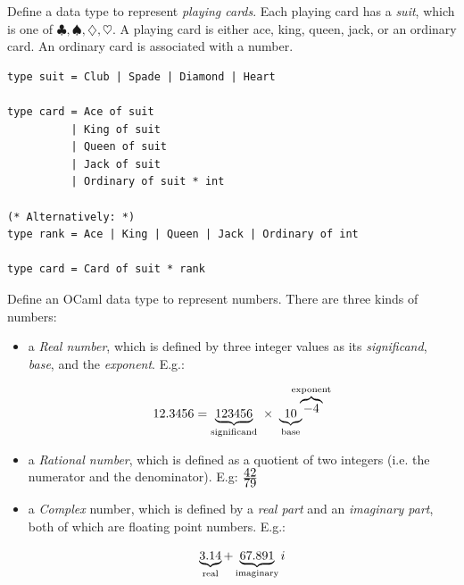 \documentclass[addpoints]{exam}
\begin{document}
\begin{questions}
  
  
  \question
  Define a data type to represent \emph{playing cards}.
  Each playing card has a \emph{suit}, which is one of
  $\clubsuit, \spadesuit, \diamondsuit, \heartsuit$.
  A playing card is either ace, king, queen, jack, or an ordinary card.
  An ordinary card is associated with a number.

  \begin{solutionbox}{6.5cm}
    \begin{verbatim}
type suit = Club | Spade | Diamond | Heart

type card = Ace of suit
          | King of suit
          | Queen of suit
          | Jack of suit
          | Ordinary of suit * int

(* Alternatively: *)
type rank = Ace | King | Queen | Jack | Ordinary of int

type card = Card of suit * rank
    \end{verbatim}
  \end{solutionbox}

  
  \question
  Define an OCaml data type to represent numbers.
  There are three kinds of numbers:
  \begin{itemize}
  \item a \emph{Real number}, which is defined by three integer values as its
    \emph{significand}, \emph{base}, and the \emph{exponent}.
    E.g.:

    $$12.3456 = \underbrace{123456}_\textrm{\scriptsize significand}~\times~\underbrace{10}_\textrm{\scriptsize base}\!\!\!\!\!\!^{\overbrace{-4}^\textrm{\scriptsize exponent}}$$
    
  \item a \emph{Rational number}, which is defined as a quotient of two integers
    (i.e. the numerator and the denominator).
    E.g: $\frac{\textrm{\normalsize 42}}{\textrm{\normalsize 79}}$
    
  \item a \emph{Complex} number, which is defined by a \emph{real part} and an \emph{imaginary part},
    both of which are floating point numbers. E.g.:

    $$ \underbrace{3.14}_\textrm{\scriptsize real} + \underbrace{67.891}_\textrm{\scriptsize imaginary} i$$
    
  \end{itemize}
  

\end{questions}
\end{document}
